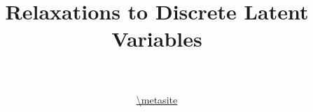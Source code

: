 \documentclass[14pt]{beamer}
\title[Relaxations]{Relaxations to Discrete Latent Variables}
\date{}
\author[VI Tutorial @ \metahost]{ \metaauthor \\ 
~\\
\url{\metasite}
}
\institute[]{\metaack}
\begin{document}
\frame{\titlepage}

\frame{\tableofcontents}


\end{document}
